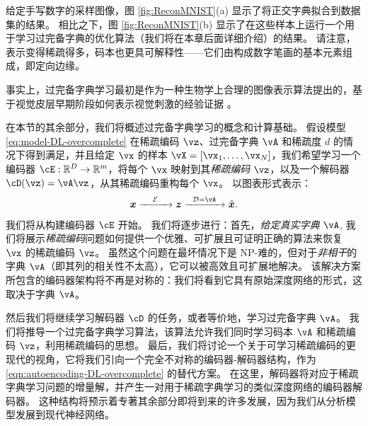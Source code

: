\documentclass[../../book-main.tex]{subfiles}
\begin{document}
\begin{example}
给定手写数字的采样图像，图 \ref{fig:ReconMNIST}(a) 显示了将正交字典拟合到数据集的结果。
相比之下，图 \ref{fig:ReconMNIST}(b) 显示了在这些样本上运行一个用于学习过完备字典的优化算法（我们将在本章后面详细介绍）的结果。
请注意，表示变得稀疏得多，码本也更具可解释性——它们由构成数字笔画的基本元素组成，即定向边缘。
\end{example}


事实上，过完备字典学习最初是作为一种生物学上合理的图像表示算法提出的，基于视觉皮层早期阶段如何表示视觉刺激的经验证据 \cite{Olshausen1996-ap,Olshausen1997-yv}。

在本节的其余部分，我们将概述过完备字典学习的概念和计算基础。
假设模型 \eqref{eq:model-DL-overcomplete} 在稀疏编码 \(\vz\)、过完备字典 \(\vA\) 和稀疏度 \(\textit{d}\) 的情况下得到满足，并且给定 \(\vx\) 的样本 \(\vX = [\vx_1, \dots, \vx_N]\)，我们希望学习一个编码器 \(\cE : \R^D \to \R^m\)，将每个 \(\vx\) 映射到其\textit{稀疏编码} \(\vz\)，以及一个解码器 \(\cD(\vz) = \vA \vz\)，从其稀疏编码重构每个 \(\vx\)。%
以图表形式表示：
\begin{equation}
\x \xrightarrow{\hspace{4mm} \mathcal{E} \hspace{4mm}}  \z \xrightarrow{\hspace{2mm} \mathcal{D} = \vA \hspace{2mm}}   \hat{\x}.  
\label{eqn:autoencoding-DL-overcomplete}
\end{equation}    

我们将从构建编码器 $\cE$ 开始。
我们将逐步进行：首先，\textit{给定真实字典 $\vA$}, 我们将展示\textit{稀疏编码}问题如何提供一个优雅、可扩展且可证明正确的算法来恢复 $\vx$ 的稀疏编码 $\vz$。
虽然这个问题在最坏情况下是 NP-难的，但对于\textit{非相干}的字典 $\vA$（即其列的相关性不太高），它可以被高效且可扩展地解决。
该解决方案所包含的编码器架构将不再是对称的：我们将看到它具有原始深度网络的形式，这取决于字典 $\vA$。

然后我们将继续学习解码器 $\cD$ 的任务，或者等价地，学习过完备字典 $\vA$。
我们将推导一个过完备字典学习算法，该算法允许我们同时学习码本 $\vA$ 和稀疏编码 $\vz$，利用稀疏编码的思想。
最后，我们将讨论一个关于可学习稀疏编码的更现代的视角，它将我们引向一个完全不对称的编码器-解码器结构，作为 \eqref{eqn:autoencoding-DL-overcomplete} 的替代方案。
在这里，解码器将对应于稀疏字典学习问题的增量解，并产生一对用于稀疏字典学习的类似深度网络的编码器解码器。
这种结构将预示着专著其余部分即将到来的许多发展，因为我们从分析模型发展到现代神经网络。
\end{document}
